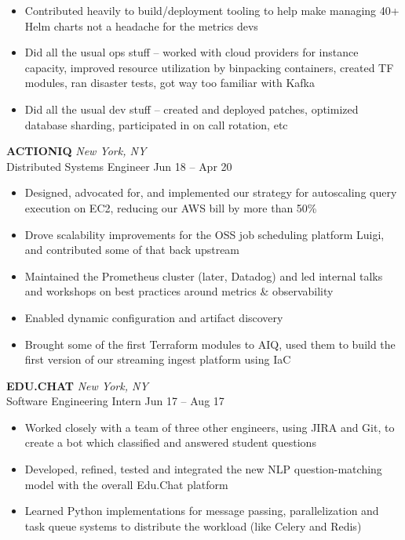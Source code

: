 \documentclass[letterpaper]{article}
\begin{document}
\begin{bgbox}[height=\paperheight, colback=white, width=0.62\textwidth]
\begin{itemize} [noitemsep,topsep=4pt]
			\item Contributed heavily to build/deployment tooling to help make managing 40+ Helm charts not a headache for the metrics devs
			\item Did all the usual ops stuff -- worked with cloud providers for instance capacity, improved resource utilization by binpacking containers, created TF modules, ran disaster tests, got way too familiar with Kafka
			\item Did all the usual dev stuff -- created and deployed patches, optimized database sharding, participated in on call rotation, etc
		\end{itemize}
		\vspace*{12pt}
		\textbf{ACTIONIQ} \hfill \textit{New York, NY}\\
		Distributed Systems Engineer \hfill Jun 18 -- Apr 20
		\begin{itemize} [noitemsep,topsep=4pt]
			\item Designed, advocated for, and implemented our strategy for autoscaling query execution on EC2, reducing our AWS bill by more than 50\%
			\item Drove scalability improvements for the OSS job scheduling platform Luigi, and contributed some of that back upstream
			\item Maintained the Prometheus cluster (later, Datadog) and led internal talks and workshops on best practices around metrics \& observability
			\item Enabled dynamic configuration and artifact discovery
			\item Brought some of the first Terraform modules to AIQ, used them to build \linebreak the first version of our streaming ingest platform using IaC
		\end{itemize}
		\vspace*{12pt}
		\textbf{EDU.CHAT} \hfill \textit{New York, NY}\\
		Software Engineering Intern \hfill Jun 17 -- Aug 17
		\begin{itemize} [noitemsep,topsep=4pt]
			\item Worked closely with a team of three other engineers, using JIRA and Git, to create a bot which classified and answered student questions
			\item Developed, refined, tested and integrated the new NLP question-matching model with the overall Edu.Chat platform
			\item Learned Python implementations for message passing, parallelization and task queue systems to distribute the workload (like Celery and Redis)
		\end{itemize}
	\end{bgbox}%
\end{document}
